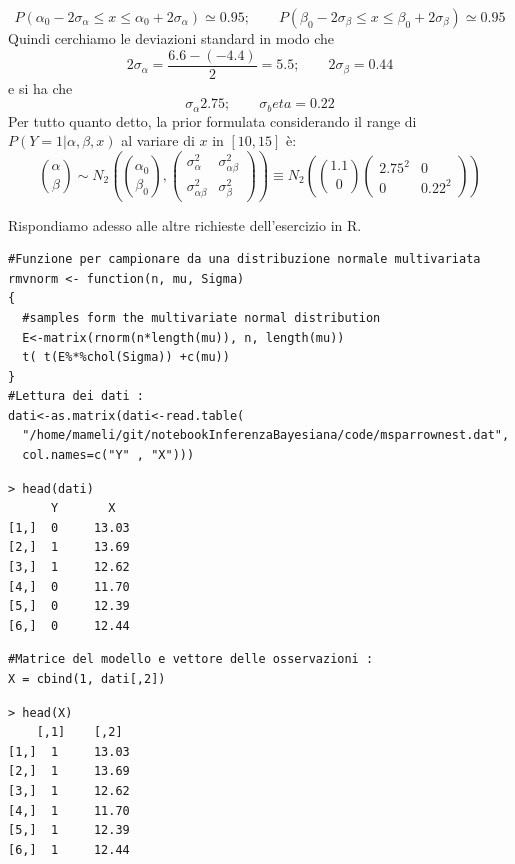 \begin{enumerate}
  $$P(\alpha_0 - 2\sigma_\alpha \leq x \leq \alpha_0 + 2\sigma_\alpha) \simeq 0.95; \qquad P(\beta_0 - 2\sigma_\beta \leq x \leq \beta_0 + 2\sigma_\beta) \simeq 0.95$$
  Quindi cerchiamo le deviazioni standard in modo che
  $$2\sigma_\alpha =  \frac{6.6 - (-4.4)}{2} = 5.5; \qquad 2\sigma_\beta = 0.44$$
  e si ha che
  $$\sigma_\alpha 2.75; \qquad \sigma_beta = 0.22$$
  Per tutto quanto detto, la prior formulata considerando il range di $P(Y=1 | \alpha, \beta, x)$ al variare di $x$ in $[10, 15]$ è:
  $$\binom{\alpha}{\beta} \sim N_2\left(\binom{\alpha_0}{\beta_0},
  \begin{pmatrix}
    \sigma^2_\alpha & \sigma^2_{\alpha\beta} \\
    \sigma^2_{\alpha\beta} & \sigma^2_\beta

  \end{pmatrix}\right) \equiv N_2 \left(\binom{1.1}{0} \begin{pmatrix} 2.75^2 & 0 \\ 0 & 0.22^2 \end{pmatrix}\right)$$
\end{enumerate}
Rispondiamo adesso alle altre richieste dell'esercizio in R.

\begin{lstlisting}[style=R]
#Funzione per campionare da una distribuzione normale multivariata
rmvnorm <- function(n, mu, Sigma)
{
  #samples form the multivariate normal distribution
  E<-matrix(rnorm(n*length(mu)), n, length(mu))
  t( t(E%*%chol(Sigma)) +c(mu))
}
#Lettura dei dati :
dati<-as.matrix(dati<-read.table(
  "/home/mameli/git/notebookInferenzaBayesiana/code/msparrownest.dat", 
  col.names=c("Y" , "X")))
\end{lstlisting}

{
\color{red}
\begin{Verbatim}
> head(dati)
      Y       X 
[1,]  0     13.03 
[2,]  1     13.69 
[3,]  1     12.62 	
[4,]  0     11.70 	
[5,]  0     12.39 	
[6,]  0     12.44
\end{Verbatim}
}

\begin{lstlisting}[style=R]
#Matrice del modello e vettore delle osservazioni :
X = cbind(1, dati[,2])
\end{lstlisting}

{
\color{red}
\begin{Verbatim}
> head(X)
    [,1]    [,2]
[1,]  1     13.03
[2,]  1     13.69
[3,]  1     12.62
[4,]  1     11.70
[5,]  1     12.39
[6,]  1     12.44
\end{Verbatim}
}


